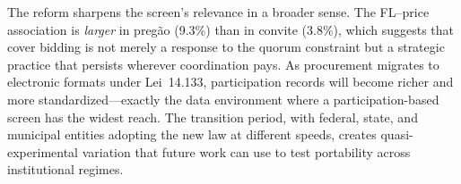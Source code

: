 The reform sharpens the screen's relevance in a broader sense. The
FL--price association is \emph{larger} in preg\~ao (9.3\%) than in
convite (3.8\%), which suggests that cover bidding is not merely a
response to the quorum constraint but a strategic practice that
persists wherever coordination pays. As procurement migrates to
electronic formats under Lei~14.133, participation records will
become richer and more standardized---exactly the data environment
where a participation-based screen has the widest reach. The
transition period, with federal, state, and municipal entities
adopting the new law at different speeds, creates quasi-experimental
variation that future work can use to test portability across
institutional regimes.
